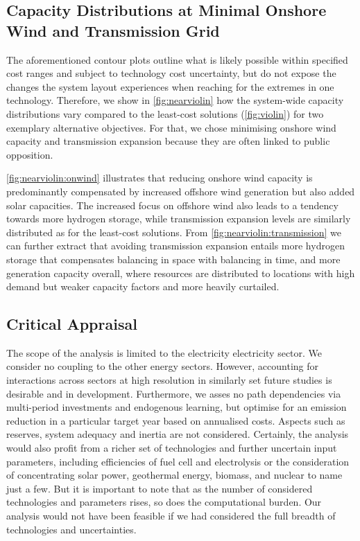 \subsection{Capacity Distributions at Minimal Onshore Wind and Transmission Grid}

The aforementioned contour plots  outline
what is likely possible within specified cost ranges and subject to technology cost uncertainty,
but do not expose
the changes the system layout experiences when reaching for the extremes in one technology.
Therefore, we show in \cref{fig:nearviolin} how the system-wide capacity distributions vary 
compared to the least-cost solutions (\cref{fig:violin}) for two exemplary alternative objectives.
For that, we chose minimising onshore wind capacity and transmission expansion
because they are often linked to public opposition.

\cref{fig:nearviolin:onwind} illustrates that reducing onshore wind capacity is
predominantly compensated by increased offshore wind generation but also added solar capacities.
The increased focus on offshore wind also leads to a tendency towards more hydrogen storage,
while transmission expansion levels are similarly distributed as for the least-cost solutions.
From \cref{fig:nearviolin:transmission} we can further extract that avoiding transmission expansion entails
more hydrogen storage that compensates balancing in space with balancing in time,
and more generation capacity overall, where resources are distributed to locations with
high demand but weaker capacity factors and more heavily curtailed.

\subsection{Critical Appraisal}

The scope of the analysis is limited to the electricity electricity sector.
We consider no coupling to the other energy sectors.
However, accounting for interactions across sectors at high resolution
in similarly set future studies is desirable and in development.
Furthermore, we asses no path dependencies via multi-period investments and endogenous learning,
but optimise for an emission reduction in a particular target year based on annualised costs.
Aspects such as reserves, system adequacy and inertia are not considered.
Certainly, the analysis would also profit from a richer set of technologies and further uncertain input parameters, including
efficiencies of fuel cell and electrolysis or the consideration of concentrating solar power,
geothermal energy, biomass, and nuclear to name just a few.
But it is important to note that as the number of considered technologies and
parameters rises, so does the computational burden. Our analysis would not have
been feasible if we had considered the full breadth of technologies and uncertainties.

